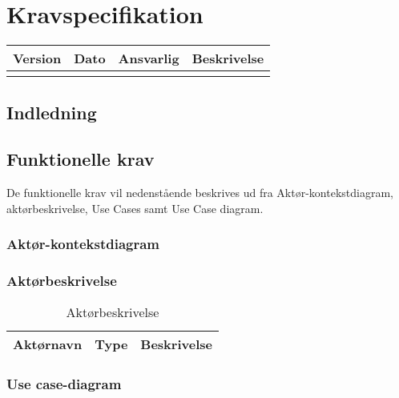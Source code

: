 \chapter{Kravspecifikation}

\begin{longtabu} to 
    Version &    Dato &    Ansvarlig &    Beskrivelse\\[-1ex]
    \midrule

\label{version_Systemark}
\end{longtabu}


\section{Indledning}


\section{Funktionelle krav}
De funktionelle krav vil nedenstående beskrives ud fra Aktør-kontekstdiagram, aktørbeskrivelse, Use Cases samt Use Case diagram. 

\subsection{Aktør-kontekstdiagram}



\subsection{Aktørbeskrivelse}

\begin{table}[H]
\begin{tabularx}{\textwidth}{l l X}
     Aktørnavn  & Type      & Beskrivelse \\ \midrule
                                                                                                                                                                        
   
     \bottomrule                                                                                                                   
    \end{tabularx}
    \caption {Aktørbeskrivelse}
    \label{tab:aktoerbeskrivelse}
	
\end{table}

\subsection{Use case-diagram}


